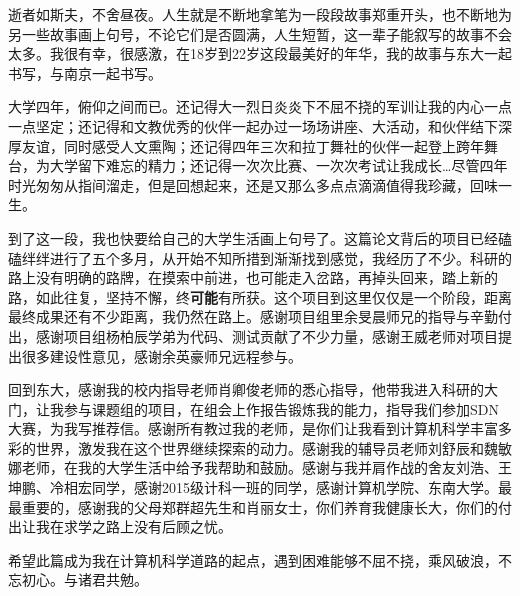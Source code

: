 \begin{Acknowledgement}{}
    \par 逝者如斯夫，不舍昼夜。人生就是不断地拿笔为一段段故事郑重开头，也不断地为另一些故事画上句号，不论它们是否圆满，人生短暂，这一辈子能叙写的故事不会太多。我很有幸，很感激，在18岁到22岁这段最美好的年华，我的故事与东大一起书写，与南京一起书写。

    \par 大学四年，俯仰之间而已。还记得大一烈日炎炎下不屈不挠的军训让我的内心一点一点坚定；还记得和文教优秀的伙伴一起办过一场场讲座、大活动，和伙伴结下深厚友谊，同时感受人文熏陶；还记得四年三次和拉丁舞社的伙伴一起登上跨年舞台，为大学留下难忘的精力；还记得一次次比赛、一次次考试让我成长\dots 尽管四年时光匆匆从指间溜走，但是回想起来，还是又那么多点点滴滴值得我珍藏，回味一生。

    \par 到了这一段，我也快要给自己的大学生活画上句号了。这篇论文背后的项目已经磕磕绊绊进行了五个多月，从开始不知所措到渐渐找到感觉，我经历了不少。科研的路上没有明确的路牌，在摸索中前进，也可能走入岔路，再掉头回来，踏上新的路，如此往复，坚持不懈，终\textbf{可能}有所获。这个项目到这里仅仅是一个阶段，距离最终成果还有不少距离，我仍然在路上。感谢项目组里余旻晨师兄的指导与辛勤付出，感谢项目组杨柏辰学弟为代码、测试贡献了不少力量，感谢王威老师对项目提出很多建设性意见，感谢余英豪师兄远程参与。

    \par 回到东大，感谢我的校内指导老师肖卿俊老师的悉心指导，他带我进入科研的大门，让我参与课题组的项目，在组会上作报告锻炼我的能力，指导我们参加SDN大赛，为我写推荐信。感谢所有教过我的老师，是你们让我看到计算机科学丰富多彩的世界，激发我在这个世界继续探索的动力。感谢我的辅导员老师刘舒辰和魏敏娜老师，在我的大学生活中给予我帮助和鼓励。感谢与我并肩作战的舍友刘浩、王坤鹏、冷相宏同学，感谢2015级计科一班的同学，感谢计算机学院、东南大学。最最重要的，感谢我的父母郑群超先生和肖丽女士，你们养育我健康长大，你们的付出让我在求学之路上没有后顾之忧。

    \par 希望此篇成为我在计算机科学道路的起点，遇到困难能够不屈不挠，乘风破浪，不忘初心。与诸君共勉。
    
\end{Acknowledgement}